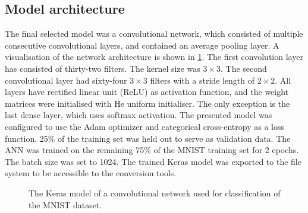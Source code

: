 \subsection{Model architecture}
The final selected model was a convolutional network, which consisted of multiple consecutive convolutional layers, and contained an average pooling layer. A visualisation of the network architecture is shown in \cref{fig:keras_model}. The first convolution layer has consisted of thirty-two filters. The kernel size was $3 \times 3$. The second convolutional layer had sixty-four $3 \times 3$ filters with a stride length of $2 \times 2$. All layers have rectified linear unit (ReLU) as activation function, and the weight matrices were initialised with He uniform initialiser. The only exception is the last dense layer, which uses softmax activation. The presented model was configured to use the Adam \cite{kingmaAdamMethod17} optimizer and categorical cross-entropy as a loss function. 25\% of the training set was held out to serve as validation data. The ANN was trained on the remaining 75\% of the MNIST training set for 2 epochs. The batch size was set to 1024. The trained Keras model was exported to the file system to be accessible to the conversion tools. \par
\begin{figure}[htbp]
    \centering
    
    \caption{The Keras model of a convolutional network used for classification of the MNIST dataset.}
    \label{fig:keras_model}
\end{figure}

